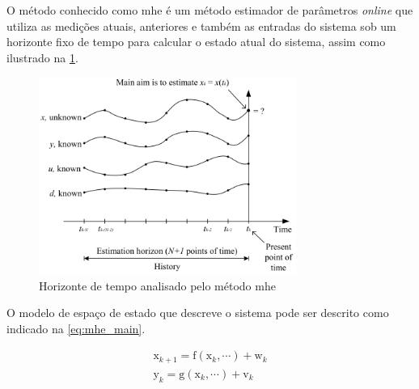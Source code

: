 O método conhecido como \acrlong{mhe} é um método estimador de parâmetros \textit{online}
que utiliza as medições atuais, anteriores e também as entradas do sistema sob um horizonte
fixo de tempo para calcular o estado atual do sistema, assim como ilustrado na \cref{fig:mhe}.

\begin{figure}[h]
	\begin{center}
		\includegraphics[width=0.75\textwidth]{./5_images/fig_mhe.png} 
		\caption{Horizonte de tempo analisado pelo método \acrlong{mhe}}
		\label{fig:mhe}
	\end{center}
\end{figure}

O modelo de espaço de estado que descreve o sistema pode ser descrito como indicado na
\cref{eq:mhe_main}.

\begin{subequations}
	\label{eq:mhe_main}
	\begin{gather}
		\mathrm{x}_{k+1} = \mathrm{f}(\mathrm{x}_k, \cdots) + \mathrm{w}_k		\label{eq:mhe_main_a} \\
		\mathrm{y}_k = \mathrm{g}(\mathrm{x}_k, \cdots) + \mathrm{v}_k			\label{eq:mhe_main_b}
	\end{gather}
\end{subequations}

